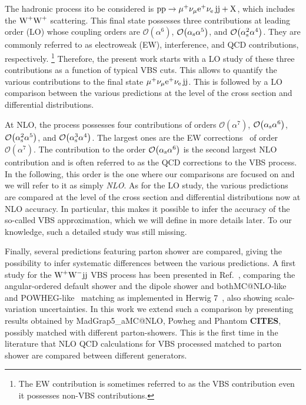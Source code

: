 The hadronic process ito be considered is $\text{p}\text{p}\to\mu^+\nu_\mu{\rm e}^+\nu_{\rm e}\,\text{j}\text{j}+\mathrm{X}$, which includes the $\text{W}^+\text{W}^+$ scattering.
This final state possesses three contributions at leading order (LO) whose coupling orders are $\mathcal{O}{\left(\alpha^{6}\right)}$, $\mathcal{O}{\left(\alpha_{\rm s}\alpha^{5}\right)}$, and $\mathcal{O}{\left(\alpha_\text{s}^{2}\alpha^{4}\right)}$.
They are commonly referred to as electroweak (EW), interference, and QCD contributions, respectively.%
\footnote{The EW contribution is sometimes referred to as the VBS contribution even it possesses non-VBS contributions.}
Therefore, the present work starts with a LO study of these three contributions as a function of typical VBS cuts.
This allows to quantify the various contributions to the final state $\mu^+\nu_\mu{\rm e}^+\nu_{\rm e}\,\text{j}\text{j}$.
This is followed by a LO comparison between the various predictions at the level of the cross section and differential distributions.

At NLO, the process possesses four contributions of orders $\mathcal{O}{\left(\alpha^{7}\right)}$, $\mathcal{O}{\left(\alpha_\text{s}\alpha^{6}\right)}$, $\mathcal{O}{\left(\alpha_\text{s}^{2}\alpha^{5}\right)}$, and $\mathcal{O}{\left(\alpha_\text{s}^{3}\alpha^{4}\right)}$.
The largest ones are the EW corrections~\cite{Biedermann:2017bss,Biedermann:2016yds} of order $\mathcal{O}{\left(\alpha^{7}\right)}$.
The contribution to the order $\mathcal{O}{\left(\alpha_\text{s}\alpha^{6}\right)}$ is the second largest NLO contribution and is often referred to as the QCD corrections to the VBS process.
In the following, this order is the one where our comparisons are focused on and we will refer to it as simply \emph{NLO}.
As for the LO study, the various predictions are compared at the level of the cross section and differential distributions now at NLO accuracy.
In particular, this makes it possible to infer the accuracy of the so-called VBS approximation, which we will define in more details later.
To our knowledge, such a detailed study was still missing.

Finally, several predictions featuring parton shower are compared, giving the possibility to infer systematic differences between the various predictions.
A first study for the $\text{W}^+ \text{W}^- \text{j} \text{j}$ VBS process has been presented in
Ref.~\cite{Rauch:2016upa}, comparing the angular-ordered default shower and the dipole
shower and both{\sc MC@NLO}-like~\cite{Frixione:2002ik} and {\sc POWHEG}-like~\cite{Nason:2004rx,Frixione:2007vw} matching as implemented
in {\sc Herwig 7}~\cite{Bellm:2015jjp}, also showing scale-variation uncertainties. In this work we extend such a comparison by presenting 
results obtained by {\sc MadGrap5\_aMC@NLO}, {\sc Powheg} and {\sc Phantom} {\bf CITES}, possibly matched with different parton-showers.
This is the first time in the literature that NLO QCD calculations for VBS processed matched to parton shower are compared between different generators.

